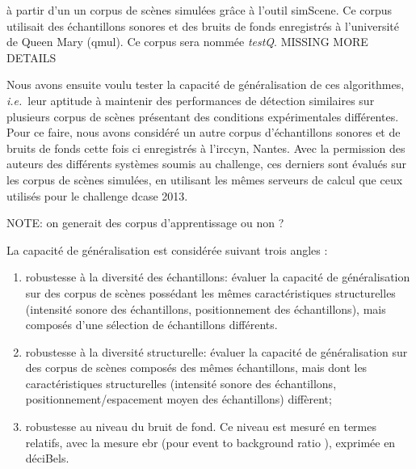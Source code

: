 à partir d'un un corpus de scènes simulées grâce à l'outil simScene. Ce corpus utilisait des échantillons sonores et des bruits de fonds enregistrés à l'université de Queen Mary (qmul). Ce corpus sera nommée \emph{testQ}. MISSING MORE DETAILS

Nous avons ensuite voulu tester la capacité de généralisation de ces algorithmes, \textit{i.e.}~leur aptitude à maintenir des performances de détection similaires sur plusieurs corpus de scènes présentant des conditions expérimentales différentes. Pour ce faire, nous avons considéré un autre corpus d'échantillons sonores et de bruits de fonds  cette fois ci enregistrés à l'irccyn, Nantes. Avec la permission des auteurs des différents systèmes soumis au challenge, ces derniers sont évalués sur les corpus de scènes simulées, en utilisant les mêmes serveurs de calcul que ceux utilisés pour le challenge dcase 2013.

NOTE: on generait des corpus d'apprentissage ou non ?

La capacité de généralisation est considérée suivant trois angles :
\begin{enumerate}
\item robustesse à la diversité des échantillons: évaluer la capacité de généralisation sur des corpus de scènes possédant les mêmes caractéristiques structurelles (intensité sonore des échantillons, positionnement des échantillons), mais composés d'une sélection de échantillons différents.
\item robustesse à la diversité structurelle: évaluer la capacité de généralisation sur des corpus de scènes composés des mêmes échantillons, mais dont les caractéristiques structurelles (intensité sonore des échantillons, positionnement/espacement moyen des échantillons) diffèrent;
\item robustesse au niveau du bruit de fond. Ce niveau est mesuré en termes relatifs, avec la mesure ebr (pour \og event to background ratio \fg), exprimée en déciBels.
\end{enumerate}

